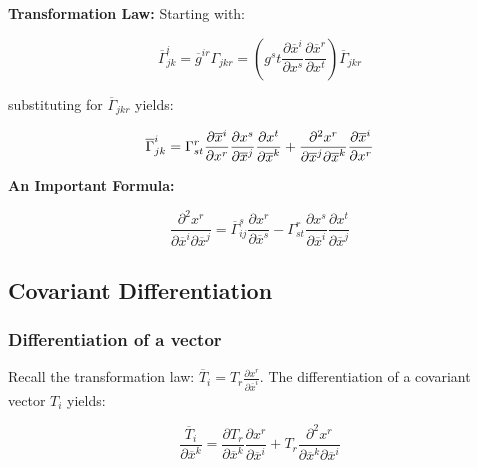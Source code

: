 \documentclass{article}
\begin{document}
\noindent \textbf{Transformation Law: }
Starting with:

\begin{equation*}
	\overline{ \Gamma }^i_{jk} = \overline{ g }^{ir} \Gamma_{jkr} = \left( g^st \frac{ \partial \overline{ x }^i }{ \partial x^s } \frac{ \partial \overline{ x }^r }{ \partial x^t } \right) \overline{ \Gamma }_{jkr}
\end{equation*}

\noindent substituting for $\overline{ \Gamma }_{jkr}$ yields:

\begin{equation}
	\overline{ \Gamma }^i_{jk} = \Gamma^r_{st} \frac{ \partial \overline{ x }^i }{ \partial x^r } \frac{ \partial x^s }{ \partial \overline{ x }^j } \frac{ \partial x^t }{ \partial \overline{ x }^k } \\
	+ \frac{ \partial^2 x^r }{ \partial \overline{ x }^j \partial \overline{ x }^k } \frac{ \partial \overline{ x }^i }{ \partial x^r }
\end{equation}

\noindent \textbf{An Important Formula: }

\begin{equation}
	\frac{ \partial^2 x^r }{ \partial \overline{ x }^i \partial \overline{ x }^j } = \overline{ \Gamma }^s_{ij} \frac{ \partial x^r }{ \partial \overline{ x }^s } - \Gamma^r_{st} \frac{ \partial x^s }{ \partial \overline{ x }^i } \frac{ \partial x^t }{ \partial \overline{ x }^j }
\end{equation}




\subsection{Covariant Differentiation}

\subsubsection{Differentiation of a vector}

Recall the transformation law: $\overline{ T }_i = T_r \frac{ \partial x^r }{ \partial \overline{ x }^i }$.  The differentiation of a covariant vector $T_i$ yields:

\begin{equation}
	\frac{ \overline{ T }_i }{ \partial \overline{ x }^k } = \frac{ \partial T_r }{ \partial \overline{ x }^k } \frac{ \partial x^r }{ \partial \overline{ x }^i } + T_r \frac{ \partial^2 x^r }{ \partial \overline{ x }^k \partial \overline{ x }^i }
\end{equation}
\end{document}
